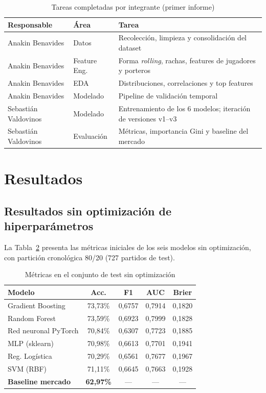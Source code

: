 \documentclass{ieeeaccess}
\begin{document}
\begin{table}[!t]
\caption{Tareas completadas por integrante (primer informe)}
\label{tab:tareas}
\centering
\footnotesize
\setlength{\tabcolsep}{3pt}
\begin{tabular}{@{}p{1.9cm}p{1.7cm}p{4.2cm}@{}}
\toprule
\textbf{Responsable} & \textbf{Área} & \textbf{Tarea} \\
\midrule
Anakin Benavides & Datos & Recolección, limpieza y consolidación del dataset \\
Anakin Benavides & Feature Eng. & Forma \textit{rolling}, rachas, features de jugadores y porteros \\
Anakin Benavides & EDA & Distribuciones, correlaciones y top features \\
Anakin Benavides & Modelado & Pipeline de validación temporal \\
Sebastián Valdovinos & Modelado & Entrenamiento de los 6 modelos; iteración de versiones v1--v3 \\
Sebastián Valdovinos & Evaluación & Métricas, importancia Gini y baseline del mercado \\
\bottomrule
\end{tabular}
\end{table}

\section{Resultados}
\label{sec:resultados}

\subsection{Resultados sin optimización de hiperparámetros}
La Tabla~\ref{tab:baseline} presenta las métricas iniciales de los seis modelos sin optimización, con partición cronológica 80/20 (727 partidos de test).

\begin{table}[!t]
\caption{Métricas en el conjunto de test sin optimización}
\label{tab:baseline}
\centering
\footnotesize
\begin{tabular}{@{}lcccc@{}}
\toprule
\textbf{Modelo} & \textbf{Acc.} & \textbf{F1} & \textbf{AUC} & \textbf{Brier} \\
\midrule
Gradient Boosting & 73,73\% & 0,6757 & 0,7914 & 0,1820 \\
Random Forest & 73,59\% & 0,6923 & 0,7999 & 0,1828 \\
Red neuronal PyTorch & 70,84\% & 0,6307 & 0,7723 & 0,1885 \\
MLP (sklearn) & 70,98\% & 0,6613 & 0,7701 & 0,1941 \\
Reg. Logística & 70,29\% & 0,6561 & 0,7677 & 0,1967 \\
SVM (RBF) & 71,11\% & 0,6645 & 0,7663 & 0,1928 \\
\midrule
\textbf{Baseline mercado} & \textbf{62,97\%} & --- & --- & --- \\
\bottomrule
\end{tabular}
\end{table}
\end{document}
